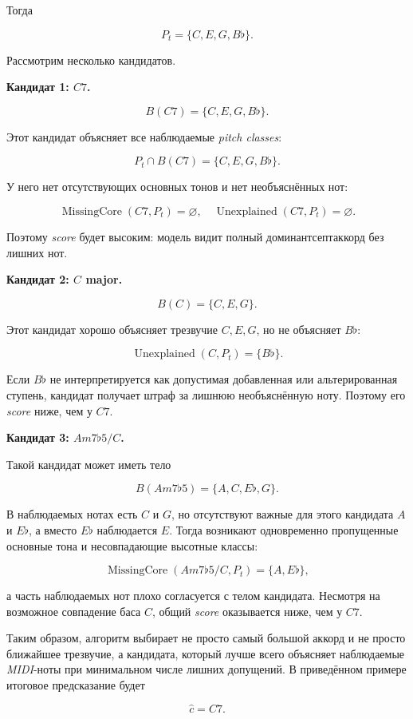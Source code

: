 \documentclass[a4paper,12pt]{extarticle}
\begin{document}
Тогда

\[
P_t = \{C, E, G, B\flat\}.
\]

Рассмотрим несколько кандидатов.

\textbf{Кандидат 1: $C7$.}

\[
B(C7)=\{C,E,G,B\flat\}.
\]

Этот кандидат объясняет все наблюдаемые \textit{pitch classes}:

\[
P_t \cap B(C7)=\{C,E,G,B\flat\}.
\]

У него нет отсутствующих основных тонов и нет необъяснённых нот:

\[
\operatorname{MissingCore}(C7, P_t)=\varnothing,
\quad
\operatorname{Unexplained}(C7, P_t)=\varnothing.
\]

Поэтому \textit{score} будет высоким: модель видит полный доминантсептаккорд без лишних нот.

\textbf{Кандидат 2: $C$ major.}

\[
B(C)=\{C,E,G\}.
\]

Этот кандидат хорошо объясняет трезвучие $C,E,G$, но не объясняет $B\flat$:

\[
\operatorname{Unexplained}(C, P_t)=\{B\flat\}.
\]

Если $B\flat$ не интерпретируется как допустимая добавленная или альтерированная ступень, кандидат получает штраф за лишнюю необъяснённую ноту. Поэтому его \textit{score} ниже, чем у $C7$.

\textbf{Кандидат 3: $Am7\flat5/C$.}

Такой кандидат может иметь тело

\[
B(Am7\flat5)=\{A,C,E\flat,G\}.
\]

В наблюдаемых нотах есть $C$ и $G$, но отсутствуют важные для этого кандидата $A$ и $E\flat$, а вместо $E\flat$ наблюдается $E$. Тогда возникают одновременно пропущенные основные тона и несовпадающие высотные классы:

\[
\operatorname{MissingCore}(Am7\flat5/C, P_t)=\{A,E\flat\},
\]

а часть наблюдаемых нот плохо согласуется с телом кандидата. Несмотря на возможное совпадение баса $C$, общий \textit{score} оказывается ниже, чем у $C7$.

Таким образом, алгоритм выбирает не просто самый большой аккорд и не просто ближайшее трезвучие, а кандидата, который лучше всего объясняет наблюдаемые \textit{MIDI}-ноты при минимальном числе лишних допущений. В приведённом примере итоговое предсказание будет

\[
\hat{c}=C7.
\]
\end{document}
